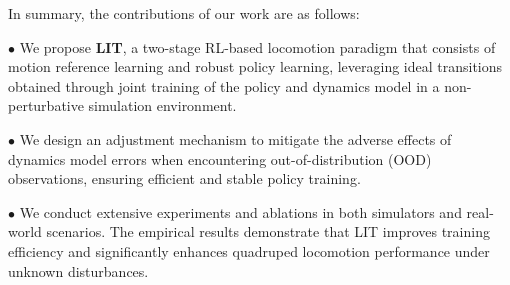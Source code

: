 In summary, the contributions of our work are as follows:

$\bullet$ We propose \textbf{LIT}, a two-stage RL-based locomotion paradigm that consists of motion reference learning and robust policy learning, leveraging ideal transitions obtained through joint training of the policy and dynamics model in a non-perturbative simulation environment.

$\bullet$ We design an adjustment mechanism to mitigate the adverse effects of dynamics model errors when encountering out-of-distribution (OOD) observations, ensuring efficient and stable policy training.

$\bullet$ We conduct extensive experiments and ablations in both simulators and real-world scenarios. The empirical results demonstrate that LIT improves training efficiency and significantly enhances quadruped locomotion performance under unknown disturbances.